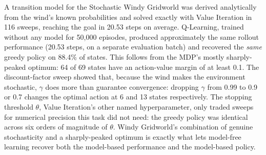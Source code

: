 \documentclass[11pt]{article}
\begin{document}
A transition model for the Stochastic Windy Gridworld was derived
analytically from the wind's known probabilities and solved exactly with
Value Iteration in 116 sweeps, reaching the goal in 20.53 steps on average.
Q-Learning, trained without any model for 50{,}000 episodes, produced
approximately the same rollout performance (20.53 steps, on a separate
evaluation batch) and recovered the \emph{same}
greedy policy on 88.4\% of states. This follows from the MDP's mostly
sharply-peaked optimum: 64 of 69 states have an action-value margin of at
least 0.1. The discount-factor sweep showed that, because the wind makes
the environment stochastic, $\gamma$ does more than guarantee convergence:
dropping $\gamma$ from 0.99 to 0.9 or 0.7 changes the optimal action at 6 and
13 states respectively. The stopping threshold $\theta$, Value Iteration's
other named hyperparameter, only traded sweeps for numerical precision this
task did not need: the greedy policy was identical across six orders of
magnitude of $\theta$. Windy Gridworld's combination of genuine stochasticity
and a sharply-peaked optimum is exactly what lets model-free learning
recover both the model-based performance and the model-based policy.
\end{document}
